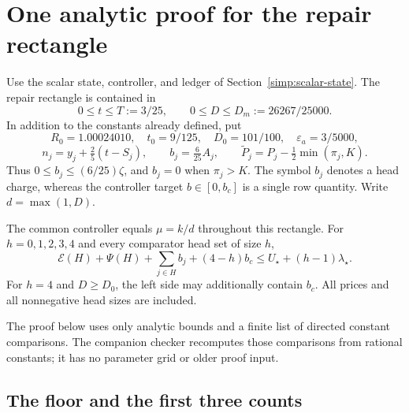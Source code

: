 \section{One analytic proof for the repair rectangle}\label{simp:scalar-A}

Use the scalar state, controller, and ledger of
Section~\ref{simp:scalar-state}.  The repair rectangle is contained in
\[
 0\le t\le T:=3/25,\qquad 0\le D\le D_m:=26267/25000.
\]
In addition to the constants already defined, put
\[
 R_0=1.00024010,\quad t_0=9/125,\quad D_0=101/100,
 \quad \varepsilon_a=3/5000,
\]
\[
 n_j=y_j+\tfrac25(t-S_j),\qquad b_j=\tfrac6{25}A_j,
 \qquad \widetilde P_j=P_j-\tfrac12\min(\pi_j,K).
\]
Thus $0\le b_j\le(6/25)\zeta$, and $b_j=0$ when $\pi_j>K$.
The symbol $b_j$ denotes a head charge, whereas the controller target
$b\in[0,b_c]$ is a single row quantity.  Write $d=\max(1,D)$.

\begin{theorem}
\label{simp:A-payment}
The common controller equals $\mu=k/d$ throughout this rectangle.
For $h=0,1,2,3,4$ and every comparator head set of size $h$,
\begin{equation}\label{simp:A-full-ledger}
 \mathcal E(H)+\Psi(H)+\sum_{j\in H}b_j+(4-h)b_c
 \le U_\star+(h-1)\lambda_\star.
\end{equation}
For $h=4$ and $D\ge D_0$, the left side may additionally contain
$b_c$.  All prices and all nonnegative head sizes are included.
\end{theorem}

The proof below uses only analytic bounds and a finite list of directed
constant comparisons.  The companion checker recomputes those comparisons
from rational constants; it has no parameter grid or older proof input.

\subsection{The floor and the first three counts}

